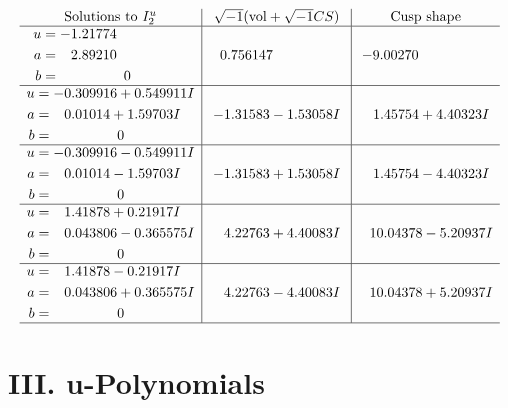 \documentclass[1p]{elsarticle_modified}
\theoremstyle{definition}
\newcommand{\I}{\sqrt{-1}}
\begin{document}
$$\begin{array}{c|c|c}  
\text{Solutions to }I^u_{2}& \I (\text{vol} + \sqrt{-1}CS) & \text{Cusp shape}\\
 \hline 
\begin{aligned}
u &= -1.21774\phantom{ +0.000000I} \\
a &= \phantom{-}2.89210\phantom{ +0.000000I} \\
b &= \phantom{-0.000000 } 0\end{aligned}
 & \phantom{-}0.756147\phantom{ +0.000000I} & -9.00270\phantom{ +0.000000I} \\ \hline\begin{aligned}
u &= -0.309916 + 0.549911 I \\
a &= \phantom{-}0.01014 + 1.59703 I \\
b &= \phantom{-0.000000 } 0\end{aligned}
 & -1.31583 - 1.53058 I & \phantom{-}1.45754 + 4.40323 I \\ \hline\begin{aligned}
u &= -0.309916 - 0.549911 I \\
a &= \phantom{-}0.01014 - 1.59703 I \\
b &= \phantom{-0.000000 } 0\end{aligned}
 & -1.31583 + 1.53058 I & \phantom{-}1.45754 - 4.40323 I \\ \hline\begin{aligned}
u &= \phantom{-}1.41878 + 0.21917 I \\
a &= \phantom{-}0.043806 - 0.365575 I \\
b &= \phantom{-0.000000 } 0\end{aligned}
 & \phantom{-}4.22763 + 4.40083 I & \phantom{-}10.04378 - 5.20937 I \\ \hline\begin{aligned}
u &= \phantom{-}1.41878 - 0.21917 I \\
a &= \phantom{-}0.043806 + 0.365575 I \\
b &= \phantom{-0.000000 } 0\end{aligned}
 & \phantom{-}4.22763 - 4.40083 I & \phantom{-}10.04378 + 5.20937 I\\
 \hline 
 \end{array}$$\newpage
\newpage\renewcommand{\arraystretch}{1}
\centering \section*{ III. u-Polynomials}
\end{document}
